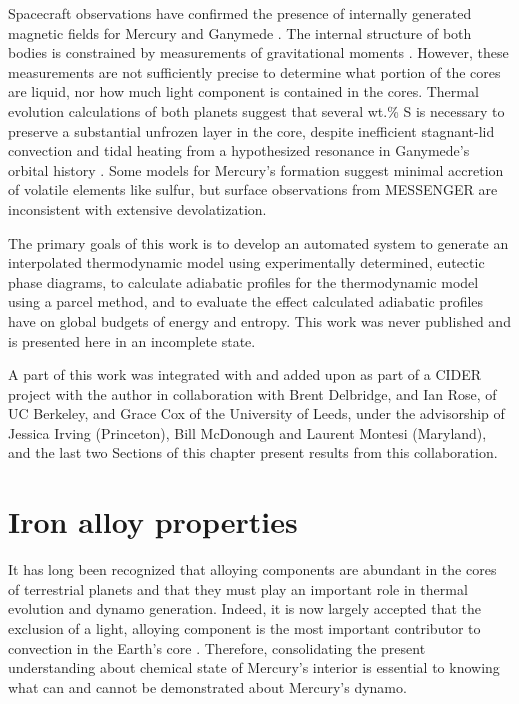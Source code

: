 Spacecraft observations have confirmed the presence of internally generated
magnetic fields for Mercury \citep{Anderson2011} and Ganymede \cite{Kivelson1996}.
The internal structure of both bodies is constrained by measurements of
gravitational moments \citep{Smith2012,Hauck2006}. However, these measurements are
not sufficiently precise to determine what portion of the cores are liquid, nor
how much light component is contained in the cores. Thermal evolution
calculations of both planets \citep{Hauck2004,Hauck2006,Breuer2007,Bland2008} suggest
that several wt.\% S is necessary to preserve a substantial unfrozen layer in
the core, despite inefficient stagnant-lid convection
\citep{Solomatov2000,Hauck2004,Breuer2007} and tidal heating from a hypothesized
resonance in Ganymede's orbital history \citep{Showman1997,Bland2008}. Some models
for Mercury's formation suggest minimal accretion of volatile elements like
sulfur, but surface observations from MESSENGER \citep{Nittler2011,Mccubbin2012} are
inconsistent with extensive devolatization.

The primary goals of this work is to develop an automated system to generate an
interpolated thermodynamic model using experimentally determined, eutectic
phase diagrams, to calculate adiabatic profiles for the thermodynamic model
using a parcel method, and to evaluate the effect calculated adiabatic profiles
have on global budgets of energy and entropy. This work was never published and
is presented here in an incomplete state.

A part of this work was integrated with and added upon as part of a CIDER project with the
author in collaboration with Brent Delbridge, and Ian Rose, of UC Berkeley, and Grace
Cox of the University of Leeds, under the advisorship of Jessica Irving (Princeton),
Bill McDonough and Laurent Montesi (Maryland), and  the last two Sections of this
chapter present results from this collaboration.

\section{Iron alloy properties}

It has long been recognized that alloying components are abundant in the cores
of terrestrial planets and that they must play an important role in thermal
evolution and dynamo generation. Indeed, it is now largely accepted that the
exclusion of a light, alloying component is the most important contributor to
convection in the Earth's core \citep{Lister1995}. Therefore,
consolidating the present understanding about chemical state of Mercury's
interior is essential to knowing what can and cannot be demonstrated about
Mercury's dynamo.

